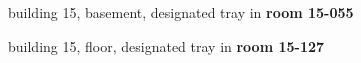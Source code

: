 	\item building 15, basement, designated tray in \textbf{room 15-055} 
	\item building 15,  floor, designated tray in \textbf{room 15-127}
